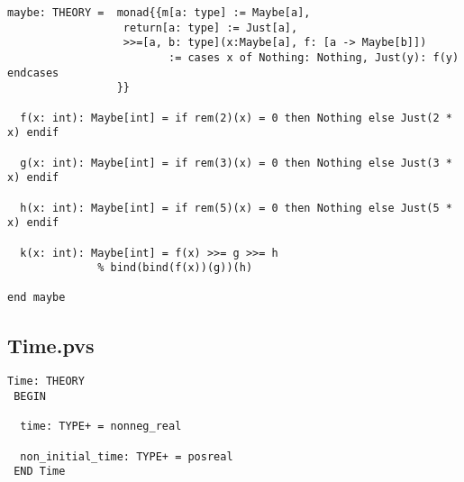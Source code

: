 \begin{singlespace}
\begin{lstlisting}[tabsize=2, language=PVS]
 maybe: THEORY =  monad{{m[a: type] := Maybe[a],
                  return[a: type] := Just[a],
                  >>=[a, b: type](x:Maybe[a], f: [a -> Maybe[b]])
                         := cases x of Nothing: Nothing, Just(y): f(y) endcases
                 }}

  f(x: int): Maybe[int] = if rem(2)(x) = 0 then Nothing else Just(2 * x) endif

  g(x: int): Maybe[int] = if rem(3)(x) = 0 then Nothing else Just(3 * x) endif

  h(x: int): Maybe[int] = if rem(5)(x) = 0 then Nothing else Just(5 * x) endif

  k(x: int): Maybe[int] = f(x) >>= g >>= h
              % bind(bind(f(x))(g))(h)
 
end maybe
\end{lstlisting}

\subsection{Time.pvs} \label{app:schedex:pvslib:time}
\end{singlespace}
\begin{lstlisting}[tabsize=2, language=PVS]
Time: THEORY
 BEGIN

  time: TYPE+ = nonneg_real

  non_initial_time: TYPE+ = posreal
 END Time
\end{lstlisting}
